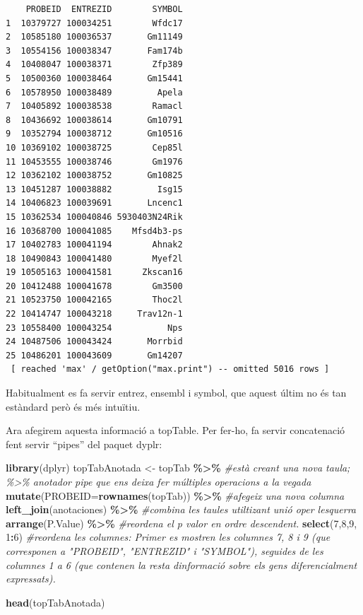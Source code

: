 \documentclass[
]{article}
\newenvironment{Shaded}{\begin{snugshade}}{\end{snugshade}}
\newcommand{\AttributeTok}[1]{\textcolor[rgb]{0.13,0.29,0.53}{#1}}
\newcommand{\CommentTok}[1]{\textcolor[rgb]{0.56,0.35,0.01}{\textit{#1}}}
\newcommand{\DecValTok}[1]{\textcolor[rgb]{0.00,0.00,0.81}{#1}}
\newcommand{\FunctionTok}[1]{\textcolor[rgb]{0.13,0.29,0.53}{\textbf{#1}}}
\newcommand{\NormalTok}[1]{#1}
\newcommand{\OtherTok}[1]{\textcolor[rgb]{0.56,0.35,0.01}{#1}}
\newcommand{\SpecialCharTok}[1]{\textcolor[rgb]{0.81,0.36,0.00}{\textbf{#1}}}
\begin{document}
\begin{verbatim}
    PROBEID  ENTREZID        SYMBOL
1  10379727 100034251        Wfdc17
2  10585180 100036537       Gm11149
3  10554156 100038347       Fam174b
4  10408047 100038371        Zfp389
5  10500360 100038464       Gm15441
6  10578950 100038489         Apela
7  10405892 100038538        Ramacl
8  10436692 100038614       Gm10791
9  10352794 100038712       Gm10516
10 10369102 100038725        Cep85l
11 10453555 100038746        Gm1976
12 10362102 100038752       Gm10825
13 10451287 100038882         Isg15
14 10406823 100039691       Lncenc1
15 10362534 100040846 5930403N24Rik
16 10368700 100041085    Mfsd4b3-ps
17 10402783 100041194        Ahnak2
18 10490843 100041480        Myef2l
19 10505163 100041581      Zkscan16
20 10412488 100041678        Gm3500
21 10523750 100042165        Thoc2l
22 10414747 100043218     Trav12n-1
23 10558400 100043254           Nps
24 10487506 100043424       Morrbid
25 10486201 100043609       Gm14207
 [ reached 'max' / getOption("max.print") -- omitted 5016 rows ]
\end{verbatim}

Habitualment es fa servir entrez, ensembl i symbol, que aquest últim no
és tan estàndard però és més intuïtiu.

Ara afegirem aquesta informació a topTable. Per fer-ho, fa servir
concatenació fent servir ``pipes'' del paquet dyplr:

\begin{Shaded}
\begin{Highlighting}[]
\FunctionTok{library}\NormalTok{(dplyr)}
\NormalTok{topTabAnotada }\OtherTok{\textless{}{-}}\NormalTok{ topTab }\SpecialCharTok{\%\textgreater{}\%}  \CommentTok{\#està creant una nova taula; \%\textgreater{}\% anotador pipe que ens deixa fer múltiples operacions a la vegada}
  \FunctionTok{mutate}\NormalTok{(}\AttributeTok{PROBEID=}\FunctionTok{rownames}\NormalTok{(topTab)) }\SpecialCharTok{\%\textgreater{}\%} \CommentTok{\#afegeix una nova columna}
  \FunctionTok{left\_join}\NormalTok{(anotaciones) }\SpecialCharTok{\%\textgreater{}\%} \CommentTok{\#combina les taules utiltizant unió oper l\textquotesingle{}esquerra}
  \FunctionTok{arrange}\NormalTok{(P.Value) }\SpecialCharTok{\%\textgreater{}\%} \CommentTok{\#reordena el p valor en ordre descendent. }
  \FunctionTok{select}\NormalTok{(}\DecValTok{7}\NormalTok{,}\DecValTok{8}\NormalTok{,}\DecValTok{9}\NormalTok{, }\DecValTok{1}\SpecialCharTok{:}\DecValTok{6}\NormalTok{) }\CommentTok{\#reordena les columnes:  Primer es mostren les columnes 7, 8 i 9 (que corresponen a "PROBEID", "ENTREZID" i "SYMBOL"), seguides de les columnes 1 a 6 (que contenen la resta d\textquotesingle{}informació sobre els gens diferencialment expressats).}

\FunctionTok{head}\NormalTok{(topTabAnotada)}
\end{Highlighting}
\end{Shaded}
\end{document}
